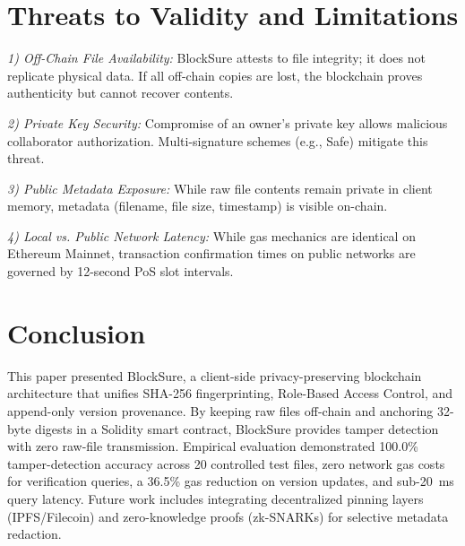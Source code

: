 \documentclass[10pt,conference,letterpaper]{IEEEtran}
\begin{document}
\section{Threats to Validity and Limitations}
\textit{1) Off-Chain File Availability:} BlockSure attests to file integrity; it does not replicate physical data. If all off-chain copies are lost, the blockchain proves authenticity but cannot recover contents.

\textit{2) Private Key Security:} Compromise of an owner's private key allows malicious collaborator authorization. Multi-signature schemes (e.g., Safe) mitigate this threat.

\textit{3) Public Metadata Exposure:} While raw file contents remain private in client memory, metadata (filename, file size, timestamp) is visible on-chain.

\textit{4) Local vs. Public Network Latency:} While gas mechanics are identical on Ethereum Mainnet, transaction confirmation times on public networks are governed by 12-second PoS slot intervals.

\section{Conclusion}
This paper presented BlockSure, a client-side privacy-preserving blockchain architecture that unifies SHA-256 fingerprinting, Role-Based Access Control, and append-only version provenance. By keeping raw files off-chain and anchoring 32-byte digests in a Solidity smart contract, BlockSure provides tamper detection with zero raw-file transmission. Empirical evaluation demonstrated 100.0\% tamper-detection accuracy across 20 controlled test files, zero network gas costs for verification queries, a 36.5\% gas reduction on version updates, and sub-20~ms query latency. Future work includes integrating decentralized pinning layers (IPFS/Filecoin) and zero-knowledge proofs (zk-SNARKs) for selective metadata redaction.
\end{document}
